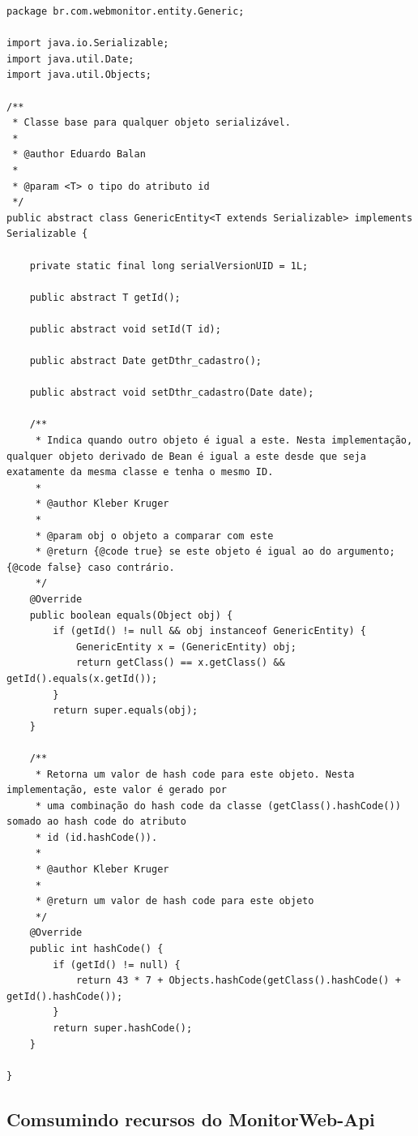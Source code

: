 \begin{lstlisting}[style=Java, label=Func:GenericEntity,caption={[Entidade genérica da aplicação GenericEntity.]Entidade genérica da aplicação GenericEntity e suas funcionalidades.}]
package br.com.webmonitor.entity.Generic;

import java.io.Serializable;
import java.util.Date;
import java.util.Objects;

/**
 * Classe base para qualquer objeto serializável.
 *
 * @author Eduardo Balan
 *
 * @param <T> o tipo do atributo id
 */
public abstract class GenericEntity<T extends Serializable> implements Serializable {

    private static final long serialVersionUID = 1L;

    public abstract T getId();

    public abstract void setId(T id);

    public abstract Date getDthr_cadastro();

    public abstract void setDthr_cadastro(Date date);

    /**
     * Indica quando outro objeto é igual a este. Nesta implementação, qualquer objeto derivado de Bean é igual a este desde que seja exatamente da mesma classe e tenha o mesmo ID.
     *
     * @author Kleber Kruger
     *
     * @param obj o objeto a comparar com este
     * @return {@code true} se este objeto é igual ao do argumento; {@code false} caso contrário.
     */
    @Override
    public boolean equals(Object obj) {
        if (getId() != null && obj instanceof GenericEntity) {
            GenericEntity x = (GenericEntity) obj;
            return getClass() == x.getClass() && getId().equals(x.getId());
        }
        return super.equals(obj);
    }

    /**
     * Retorna um valor de hash code para este objeto. Nesta implementação, este valor é gerado por
     * uma combinação do hash code da classe (getClass().hashCode()) somado ao hash code do atributo
     * id (id.hashCode()).
     *
     * @author Kleber Kruger
     *
     * @return um valor de hash code para este objeto
     */
    @Override
    public int hashCode() {
        if (getId() != null) {
            return 43 * 7 + Objects.hashCode(getClass().hashCode() + getId().hashCode());
        }
        return super.hashCode();
    }

}
\end{lstlisting}


\subsection{Comsumindo recursos do MonitorWeb-Api}\label{subsec:ComsumindoRecursos}

